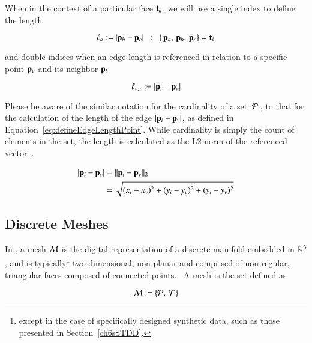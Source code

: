 When in the context of a particular face $\mathbf{t}_k$, we will use a single index to define the length

\begin{equation}
	\ell_a := |\mathbf{p}_b - \mathbf{p}_c| \enspace:\enspace \left \{\,\mathbf{p}_a,\,\mathbf{p}_b,\,\mathbf{p}_c\right \} = \mathbf{t}_k
	\label{eq:defineEdgeLengthFace}
\end{equation}%
%

and double indices when an edge length is referenced in relation to a specific point $\mathbf{p}_v$ and its neighbor $\mathbf{p}_i$

\begin{equation}
	\ell_{v,\kern.75pt i} := |\mathbf{p}_i - \mathbf{p}_v|
	\label{eq:defineEdgeLengthPoint}
\end{equation}%
%

Please be aware of the similar notation for the cardinality of a set $|\mathcal{P}|$, to that for the calculation of the length of the edge $|\mathbf{p}_i - \mathbf{p}_v|$, as defined in Equation~\ref{eq:defineEdgeLengthPoint}. While cardinality is simply the count of elements in the set, the length is calculated as the L2-norm of the referenced vector~\cite[p.~26]{Mara12}.

\begin{equation}
\begin{aligned}
	|\mathbf{p}_i - \mathbf{p}_v| & = \lVert\mathbf{p}_i - \mathbf{p}_v\rVert_2 \\
					& = \sqrt{(x_i-x_v)^2 + (y_i-y_v)^2 + (y_i-y_v)^2}
	\label{eq:defineEdgeLengthCalc}
\end{aligned}
\end{equation}

%
%
%
%
\subsection{Discrete Meshes}
\label{ch2sTDDssDM}
In \tdd{}, a mesh $\mathcal{M}$ is the digital representation of a discrete manifold embedded in $\mathbb{R}^{3}$, and is typically\footnote{except in the case of specifically designed synthetic data, such as those presented in Section~\ref{ch6sSTDD}.} two-dimensional, non-planar and comprised of non-regular, triangular faces composed of connected points.~\cite[p.~25]{Mara12} A mesh is the set defined as

\begin{equation}
	\mathcal{M} := \left \{\mathcal{P},\:\mathcal{T}\right \}
	\label{eq:defineMesh}
\end{equation}%
%


